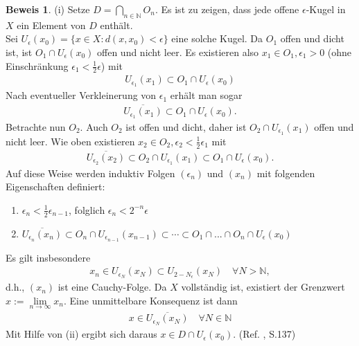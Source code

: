 \documentclass[10pt,a4paper]{article}
\theoremstyle{plain}
\theoremstyle{definition}
\theoremstyle{nonumberplain}
\newtheorem{beweis}{Beweis}
\newenvironment{bew}{\begin{beweis}}{\end{beweis}}
\newcommand{\N}{\mathbb{N}}
\begin{document}
\begin{bew}
(i) Setze $D = \bigcap\limits_{n \in \N}{O_n}$. Es ist zu zeigen, dass jede offene $\epsilon$-Kugel in $X$ ein Element von $D$ enthält.\\
Sei $U_\epsilon(x_0) = \{x \in X: d(x,x_0) < \epsilon\}$ eine solche Kugel. Da $O_1$ offen und dicht ist, ist $O_1 \cap U_\epsilon(x_0)$ offen und nicht leer. Es existieren also $x_1 \in O_1, \epsilon_1 > 0$ (ohne Einschränkung $\epsilon_1 < \frac{1}{2}\epsilon$) mit
\begin{align*}
U_{\epsilon_1}(x_1) \subset O_1 \cap U_\epsilon(x_0)
\end{align*}
Nach eventueller Verkleinerung von $\epsilon_1$ erhält man sogar
\begin{align*}
\overline{U_{\epsilon_1}(x_1)} \subset O_1 \cap U_\epsilon(x_0).
\end{align*}
Betrachte nun $O_2$. Auch $O_2$ ist offen und dicht, daher ist $O_2 \cap U_{\epsilon_1}(x_1)$ offen und nicht leer. Wie oben existieren $x_2 \in O_2, \epsilon_2 < \frac{1}{2}\epsilon_1$ mit
\begin{align*}
\overline{U_{\epsilon_2}(x_2)} \subset O_2 \cap U_{\epsilon_1}(x_1) \subset O_1 \cap U_\epsilon(x_0).
\end{align*}
Auf diese Weise werden induktiv Folgen $(\epsilon_n)$ und $(x_n)$ mit folgenden Eigenschaften definiert:
\begin{enumerate}[label=(\roman*)]
\item $\epsilon_n <  \frac{1}{2}\epsilon_{n-1}$, folglich $\epsilon_n < 2^{-n}\epsilon$
\item $\overline{U_{\epsilon_n}(x_n)} \subset O_n \cap U_{\epsilon_{n-1}}(x_{n-1}) \subset \cdots \subset O_1 \cap ... \cap O_n \cap U_\epsilon(x_0)$
\end{enumerate}
Es gilt insbesondere
\begin{align*}
x_n \in U_{\epsilon_N}(x_N) \subset U_{2 - N_\epsilon}(x_N) \quad \forall N > \N,
\end{align*}
d.h., $(x_n)$ ist eine Cauchy-Folge. Da $X$ vollständig ist, existiert der Grenzwert $x := \lim\limits_{n \to \infty}{x_n}$. Eine unmittelbare Konsequenz ist dann
\begin{align*}
x \in \overline{U_{\epsilon_N}(x_N)} \quad \forall N \in \N
\end{align*}
Mit Hilfe von (ii) ergibt sich daraus $x \in D \cap U_\epsilon(x_0)$. (Ref. \cite{Werner}, S.137) 
\end{bew}
\newpage

\end{document}
